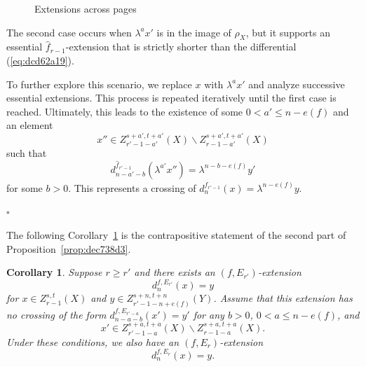 \documentclass[12pt,a4paper]{article}
\renewenvironment{proof}{{\noindent\it\textbf{Proof}}\quad\it}{\hfill$\square$}
\newtheorem{corollary}[equation]{Corollary}
\newcommand{\drawarrow}{\draw[-{Stealth[length=1.5mm]}, shorten >=(0.08cm)]}
\begin{document}
\begin{sloppy}
\begin{proof}
\begin{figure}[h]
{}
    \caption{Extensions across pages}\label{fig:b22d961f}
    \end{figure}

    The second case occurs when $\lambda^ax'$ is in the image of $\rho_X$, but it supports an essential $\hat f_{r-1}$-extension that is strictly shorter than the differential (\ref{eq:dcd62a19}).

    To further explore this scenario, we replace $x$ with $\lambda^ax'$ and analyze successive essential extensions. This process is repeated iteratively until the first case is reached. Ultimately, this leads to the existence of some $0<a'\le n-e(f)$ and an element
    $$x''\in Z_{r'-1-a'}^{s+a',t+a'}(X)\backslash Z_{r-1-a'}^{s+a',t+a'}(X)$$
    such that
    $$d^{\hat f_{r'-1}}_{n-a'-b}(\lambda^{a'} x'')=\lambda^{n-b-e(f)} y'$$
    for some $b>0$. This represents a crossing of $d^{\hat f_{r'-1}}_n(x)=\lambda^{n-e(f)}y$.

\end{proof}


The following Corollary~\ref{cor:dfc6043e} is the contrapositive statement of the second part of Proposition~\ref{prop:dec738d3}.


\begin{corollary}\label{cor:dfc6043e}
    Suppose $r\ge r'$ and there exists an $(f,E_{r'})$-extension
    $$d^{f,E_{r'}}_n(x)=y$$
    for $x\in Z_{r-1}^{s,t}(X)$ and $y\in Z_{r'-1-n+e(f)}^{s+n,t+n}(Y)$. Assume that this extension has no crossing of the form $d^{f,E_{r'-a}}_{n-a-b}(x')=y'$ for any $b>0$, $0<a\le n-e(f)$, and
    $$x'\in Z_{r'-1-a}^{s+a,t+a}(X)\backslash Z_{r-1-a}^{s+a,t+a}(X).$$
    Under these conditions, we also have an $(f,E_{r})$-extension
    $$d^{f,E_{r}}_n(x)=y.$$
\end{corollary}



\end{sloppy}
\end{document}
